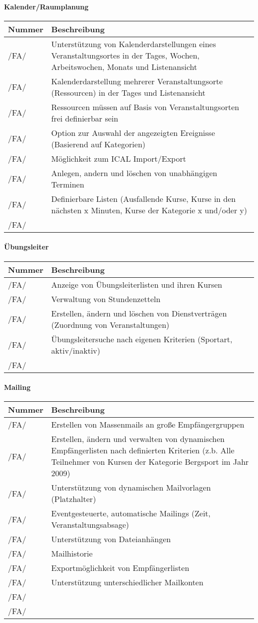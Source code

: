 \documentclass[a4paper,12pt]{article}
\newcommand\addrow[2]{#1 &#2\\ }
\newcommand\addheading[2]{#1 &#2\\ \hline}
\newcommand\tabularhead{\begin{tabular}{lp{13cm}}
\hline
}
\newenvironment{usecase}{\tabularhead}
{\hline\end{tabular}}
\begin{document}
\paragraph{\textbf{Kalender/Raumplanung}\\}
\begin{usecase}
  \addheading{Nummer}{Beschreibung} 
  \addrow{/FA/}{Unterstützung von Kalenderdarstellungen eines Veranstaltungsortes in der Tages, Wochen, Arbeitswochen, Monats und Listenansicht}
  \addrow{/FA/}{Kalenderdarstellung mehrerer Veranstaltungsorte (Ressourcen) in der Tages und Listenansicht}
  \addrow{/FA/}{Ressourcen müssen auf Basis von Veranstaltungsorten frei definierbar sein}
  \addrow{/FA/}{Option zur Auswahl der angezeigten Ereignisse (Basierend auf Kategorien)}
  \addrow{/FA/}{Möglichkeit zum ICAL Import/Export}
  \addrow{/FA/}{Anlegen, andern und löschen von unabhängigen Terminen}
  \addrow{/FA/}{Definierbare Listen (Ausfallende Kurse, Kurse in den nächsten x Minuten, Kurse der Kategorie x und/oder y)}
  \addrow{/FA/}{}
\end{usecase}

\paragraph{\textbf{Übungsleiter}\\}
\begin{usecase}
  \addheading{Nummer}{Beschreibung} 
  \addrow{/FA/}{Anzeige von Übungsleiterlisten und ihren Kursen}
  \addrow{/FA/}{Verwaltung von Stundenzetteln}
  \addrow{/FA/}{Erstellen, ändern und löschen von Dienstverträgen (Zuordnung von Veranstaltungen)}
  \addrow{/FA/}{Übungsleitersuche nach eigenen Kriterien (Sportart, aktiv/inaktiv)}
  \addrow{/FA/}{}
\end{usecase}

\paragraph{\textbf{Mailing}\\}
\begin{usecase}
  \addheading{Nummer}{Beschreibung} 
  \addrow{/FA/}{Erstellen von Massenmails an große Empfängergruppen}
  \addrow{/FA/}{Erstellen, ändern und verwalten von dynamischen Empfängerlisten nach definierten Kriterien (z.b. Alle Teilnehmer von Kursen der Kategorie Bergsport im Jahr 2009)}
  \addrow{/FA/}{Unterstützung von dynamischen Mailvorlagen (Platzhalter)}
  \addrow{/FA/}{Eventgesteuerte, automatische Mailings (Zeit, Veranstaltungsabsage)}
  \addrow{/FA/}{Unterstützung von Dateianhängen}
  \addrow{/FA/}{Mailhistorie}
  \addrow{/FA/}{Exportmöglichkeit von Empfängerlisten}
  \addrow{/FA/}{Unterstützung unterschiedlicher Mailkonten}
  \addrow{/FA/}{}
  \addrow{/FA/}{}
\end{usecase}
\end{document}
